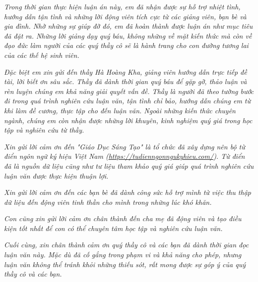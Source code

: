 

\newpage
{}
\thispagestyle{loi_cam_on}
\begin{center}
{}
\end{center}

\textit{Trong thời gian thực hiện luận án này, em đã nhận được sự hỗ trợ nhiệt tình, hướng dẫn tận tình và những lời động viên tích cực từ các giảng viên, bạn bè và gia đình. Nhờ những sự giúp đỡ đó, em đã hoàn thành được luận án như mục tiêu đã đặt ra. Những lời giảng dạy quý báu, không những về mặt kiến thức mà còn về đạo đức làm người của các quý thầy cô sẽ là hành trang cho con đường tương lai của các thế hệ sinh viên.}

\textit{Đặc biệt em xin gửi đến thầy Hà Hoàng Kha, giảng viên hướng dẫn trực tiếp đề tài, lời biết ơn sâu sắc. Thầy đã dành thời gian quý báu để gặp gỡ, thảo luận và rèn luyện chúng em khả năng giải quyết vấn đề. Thầy là người đã theo tường bước đi trong quá trình nghiên cứu luận văn, tận tình chỉ bảo, hướng dẫn chúng em từ khi làm đề cương, thực tập cho đến luận văn. Ngoài những kiến thức chuyên ngành, chúng em còn nhận được những lời khuyên, kinh nghiệm quý giá trong học tập và nghiên cứu từ thầy.}

\textit{Xin gửi lời cảm ơn đến "Giáo Dục Sáng Tạo" là tổ chức đã xây dựng nên bộ từ điển ngôn ngữ ký hiệu Việt Nam (\url{https://tudienngonngukyhieu.com/}). Từ điển đã là nguồn dữ liệu cũng như tư liệu tham khảo quý giá giúp quá trình nghiên cứu luận văn được thực hiện thuận lợi.}

\textit{Xin gửi lời cảm ơn đến các bạn bè đã dành công sức hỗ trợ mình từ việc thu thập dữ liệu đến động viên tinh thần cho mình trong những lúc khó khăn.}

\textit{Con cũng xin gửi lời cảm ơn chân thành đến cha mẹ đã động viên và tạo điều kiện tốt nhất để con có thể chuyên tâm học tập và nghiên cứu luận văn.}

\textit{Cuối cùng, xin chân thành cảm ơn quý thầy cô và các bạn đã dành thời gian đọc luận văn này. Mặc dù đã cố gắng trong phạm vi và khả năng cho phép, nhưng luận văn không thể tránh khỏi những thiếu sót, rất mong được sự góp ý của quý thầy cô và các bạn.}



